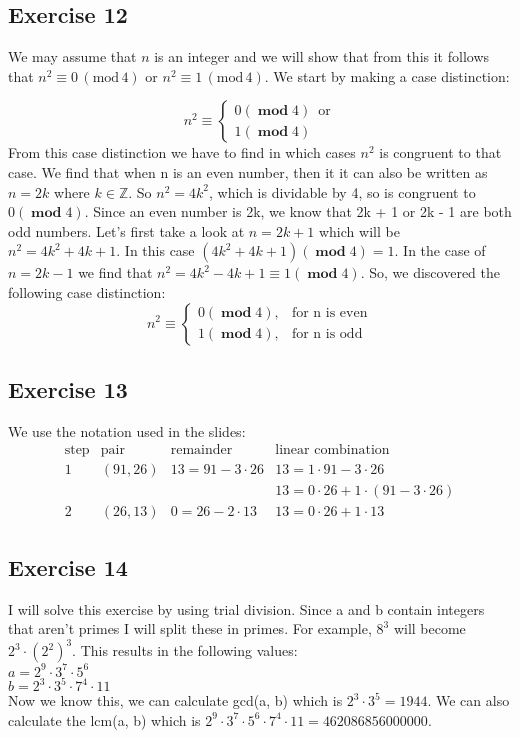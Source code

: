 \documentclass[a4paper]{article}
\newcommand{\exercise}[2]{\subsection*{Exercise #1}{#2}}
\newcommand{\ZZ}{\ensuremath{\mathbb{Z}}}
\DeclareMathOperator{\emod}{\mathbf{mod}}
\newcommand{\tmod}{\mbox{mod}\xspace}
\begin{document}
\exercise{12}{%
We may assume that $n$ is an integer
and we will show that from this it follows that
$n^2 \equiv 0 \, (\tmod\, 4)$ %
or
$n^2 \equiv 1 \, (\tmod\, 4)$.
We start by making a case distinction:

\begin{equation}
    n^2 \equiv
    \begin{cases*}
        0(\emod 4)
        \enspace \text{or} \\
        1(\emod 4)
    \end{cases*}
  \end{equation}
  From this case distinction we have to find in which cases $n^2$ is congruent to that case. We find that when n is an even number, then it it can also be written as $n = 2k$ where $k \in  \ZZ$. So $n^2 = 4k^2$, which is dividable by 4, so is congruent to $0 (\emod 4)$. Since an even number is 2k, we know that 2k + 1 or 2k - 1 are both odd numbers. Let's first take a look at $n = 2k + 1$ which will be $n^2 = 4k^2 + 4k + 1$. In this case $(4k^2 + 4k + 1)(\emod 4) = 1$. In the case of $n = 2k - 1$ we find that $n^2 = 4k^2 - 4k + 1 \equiv 1(\emod 4)$. So, we discovered the following case distinction:
\begin{equation}
    n^2 \equiv
    \begin{cases*}
        0(\emod 4), & \text{for n is even}   \\
        1(\emod 4), & \text{for n is odd}
    \end{cases*}
  \end{equation}
}

\exercise{13}{%
We use the notation used in the slides:
\[
\begin{array}{c|c|c|l}
\mbox{step} & \mbox{pair} & \mbox{remainder} & \mbox{linear combination}
\\ \hline
1 & (91,26)     & 13 = 91 - 3 \cdot 26  & 13 = 1 \cdot 91 - 3 \cdot 26 \\
  &             &                       & 13 = 0 \cdot 26 + 1 \cdot (91 - 3 \cdot 26) \\
2 & (26, 13)    & 0 = 26 - 2 \cdot 13       & 13 = 0 \cdot 26 + 1 \cdot 13
\end{array}
\]
}

\exercise{14}{%
I will solve this exercise by using trial division. Since a and b contain integers that aren't primes I will split these in primes. For example, $8^3$ will become $2^3 \cdot (2^2)^3$. This results in the following values: \\
$a = 2^9 \cdot 3^7 \cdot 5^6$ \\
$b = 2^3 \cdot 3^5 \cdot 7^4 \cdot 11$ \\
Now we know this, we can calculate gcd(a, b) which is $2^3 \cdot 3^5 = 1944$. We can also calculate the lcm(a, b) which is $2^9 \cdot 3^7 \cdot 5^6 \cdot 7^4 \cdot 11 = 462086856000000$.
}
\end{document}
